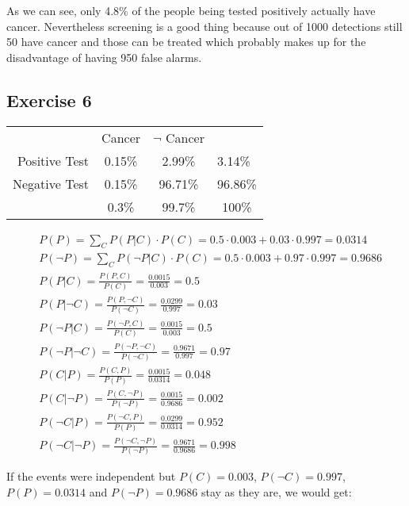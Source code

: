 As we can see, only 4.8\% of the people being tested positively actually have cancer. Nevertheless screening is a good thing because out of 1000 detections still 50 have cancer and those can be treated which probably makes up for the disadvantage of having 950 false alarms.  

\setcounter{equation}{0}
\subsection*{Exercise 6}

\begin{tabular}{ r|c|c|l }
\multicolumn{1}{r}{}
 &  \multicolumn{1}{c}{Cancer}
 & \multicolumn{1}{c}{$\neg$ Cancer} \\
\cline{2-3}
Positive Test & 0.15\% & 2.99\% & 3.14\%\\ 
\cline{2-3}
Negative Test & 0.15\% & 96.71\% & 96.86\% \\
\cline{2-3}
\multicolumn{1}{r}{}
 &  \multicolumn{1}{c}{0.3\%}
 & \multicolumn{1}{c}{99.7\%}  & \multicolumn{1}{c}{100\%}\\
\end{tabular}

\begin{align*}
& P(P) = \sum_{C}{P(P|C) \cdot P(C)} = 0.5 \cdot 0.003 + 0.03 \cdot 0.997 = 0.0314\\
& P(\neg P) = \sum_{C}{P(\neg P|C) \cdot P(C)} = 0.5 \cdot 0.003 + 0.97 \cdot 0.997 = 0.9686\\ 
& P(P|C) = \frac{P(P,C)}{P(C)} = \frac{0.0015}{0.003} = 0.5 \\
& P(P|\neg C) = \frac{P(P,\neg C)}{P(\neg C)} = \frac{0.0299}{0.997} = 0.03 \\
& P(\neg P|C) = \frac{P(\neg P,C)}{P(C)} = \frac{0.0015}{0.003} = 0.5 \\
& P(\neg P|\neg C) = \frac{P(\neg P,\neg C)}{P(\neg C)} = \frac{0.9671}{0.997}= 0.97\\
& P(C|P) = \frac{P(C,P)}{P(P)} = \frac{0.0015}{0.0314} = 0.048 \\
& P(C|\neg P) = \frac{P(C,\neg P)}{P(\neg P)} = \frac{0.0015}{0.9686} = 0.002 \\
& P(\neg C|P) = \frac{P(\neg C,P)}{P(P)} = \frac{0.0299}{0.0314} = 0.952 \\
& P(\neg C|\neg P) = \frac{P(\neg C,\neg P)}{P(\neg P)} = \frac{0.9671}{0.9686}= 0.998 
\end{align*}

If the events were independent but $P(C)=0.003$, $P(\neg C)=0.997$, $P(P)=0.0314$ and $P(\neg P)=0.9686$ stay as they are, we would get:

